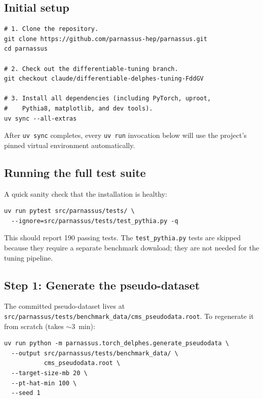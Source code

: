 \documentclass[a4paper,11pt]{article}
\begin{document}
\subsection{Initial setup}

\begin{verbatim}
# 1. Clone the repository.
git clone https://github.com/parnassus-hep/parnassus.git
cd parnassus

# 2. Check out the differentiable-tuning branch.
git checkout claude/differentiable-delphes-tuning-FddGV

# 3. Install all dependencies (including PyTorch, uproot,
#    Pythia8, matplotlib, and dev tools).
uv sync --all-extras
\end{verbatim}

After \texttt{uv sync} completes, every \texttt{uv run} invocation
below will use the project's pinned virtual environment automatically.

\subsection{Running the full test suite}

A quick sanity check that the installation is healthy:

\begin{verbatim}
uv run pytest src/parnassus/tests/ \
  --ignore=src/parnassus/tests/test_pythia.py -q
\end{verbatim}

This should report 190 passing tests. The \texttt{test\_pythia.py}
tests are skipped because they require a separate benchmark download;
they are not needed for the tuning pipeline.

\subsection{Step 1: Generate the pseudo-dataset}
\label{app:step1}

The committed pseudo-dataset lives at\\
\texttt{src/parnassus/tests/benchmark\_data/cms\_pseudodata.root}.
To regenerate it from scratch (takes $\sim$3~min):

\begin{verbatim}
uv run python -m parnassus.torch_delphes.generate_pseudodata \
  --output src/parnassus/tests/benchmark_data/ \
           cms_pseudodata.root \
  --target-size-mb 20 \
  --pt-hat-min 100 \
  --seed 1
\end{verbatim}
\end{document}
